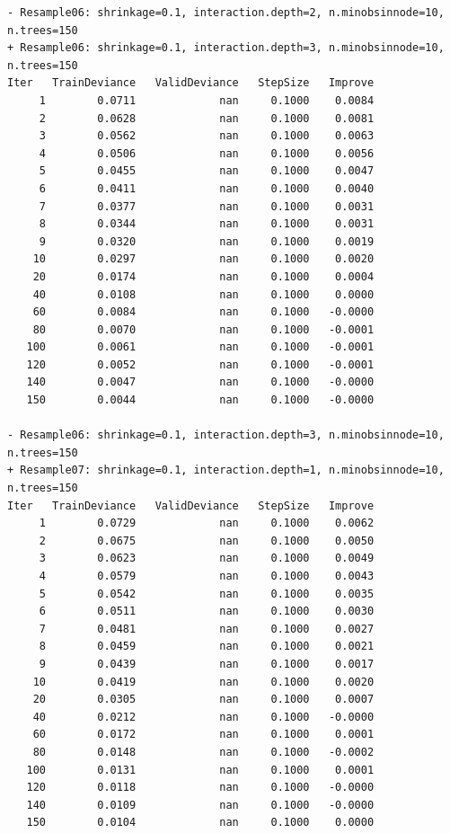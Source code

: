 \documentclass[
  letterpaper,
  DIV=11,
  numbers=noendperiod]{scrartcl}
\begin{document}
\begin{verbatim}
- Resample06: shrinkage=0.1, interaction.depth=2, n.minobsinnode=10, n.trees=150 
+ Resample06: shrinkage=0.1, interaction.depth=3, n.minobsinnode=10, n.trees=150 
Iter   TrainDeviance   ValidDeviance   StepSize   Improve
     1        0.0711             nan     0.1000    0.0084
     2        0.0628             nan     0.1000    0.0081
     3        0.0562             nan     0.1000    0.0063
     4        0.0506             nan     0.1000    0.0056
     5        0.0455             nan     0.1000    0.0047
     6        0.0411             nan     0.1000    0.0040
     7        0.0377             nan     0.1000    0.0031
     8        0.0344             nan     0.1000    0.0031
     9        0.0320             nan     0.1000    0.0019
    10        0.0297             nan     0.1000    0.0020
    20        0.0174             nan     0.1000    0.0004
    40        0.0108             nan     0.1000    0.0000
    60        0.0084             nan     0.1000   -0.0000
    80        0.0070             nan     0.1000   -0.0001
   100        0.0061             nan     0.1000   -0.0001
   120        0.0052             nan     0.1000   -0.0001
   140        0.0047             nan     0.1000   -0.0000
   150        0.0044             nan     0.1000   -0.0000

- Resample06: shrinkage=0.1, interaction.depth=3, n.minobsinnode=10, n.trees=150 
+ Resample07: shrinkage=0.1, interaction.depth=1, n.minobsinnode=10, n.trees=150 
Iter   TrainDeviance   ValidDeviance   StepSize   Improve
     1        0.0729             nan     0.1000    0.0062
     2        0.0675             nan     0.1000    0.0050
     3        0.0623             nan     0.1000    0.0049
     4        0.0579             nan     0.1000    0.0043
     5        0.0542             nan     0.1000    0.0035
     6        0.0511             nan     0.1000    0.0030
     7        0.0481             nan     0.1000    0.0027
     8        0.0459             nan     0.1000    0.0021
     9        0.0439             nan     0.1000    0.0017
    10        0.0419             nan     0.1000    0.0020
    20        0.0305             nan     0.1000    0.0007
    40        0.0212             nan     0.1000   -0.0000
    60        0.0172             nan     0.1000    0.0001
    80        0.0148             nan     0.1000   -0.0002
   100        0.0131             nan     0.1000    0.0001
   120        0.0118             nan     0.1000   -0.0000
   140        0.0109             nan     0.1000   -0.0000
   150        0.0104             nan     0.1000    0.0000


\end{verbatim}
\end{document}
